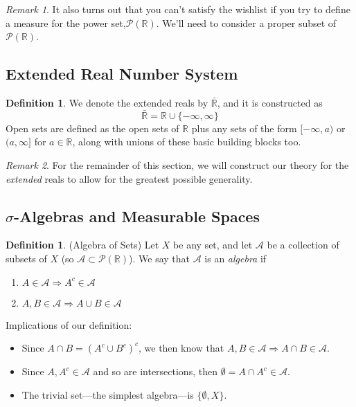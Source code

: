 \documentclass[12pt]{article}
\theoremstyle{plain}
\theoremstyle{definition}
\newtheorem{defn}[thm]{Definition}
\theoremstyle{remark}
\newtheorem*{rmk}{Remark}
\begin{document}
\begin{rmk}
    It also turns out that you can't satisfy the wishlist if you try to define a measure for the power set,$\mathscr{P}(\mathbb{R})$. We'll need to consider a proper subset of $\mathscr{P}(\mathbb{R})$.
\end{rmk}

\subsection{Extended Real Number System}

\begin{defn}
We denote the extended reals by $\bar{\mathbb{R}}$, and it is constructed as 
\[ 
    \bar{\mathbb{R}} = {\mathbb{R}} \cup \{-\infty, \infty\}
\]
Open sets are defined as the open sets of $\mathbb{R}$ plus any sets of the form $[-\infty, a)$ or $(a,\infty]$ for $a\in\mathbb{R}$, along with unions of these basic building blocks too.
\end{defn}

\begin{rmk}
For the remainder of this section, we will construct our theory for the \emph{extended} reals to allow for the greatest possible generality.
\end{rmk}

\subsection{$\sigma$-Algebras and Measurable Spaces}

\begin{defn} 
\label{algebra}
(Algebra of Sets)
Let $X$ be any set, and let $\mathscr{A}$ be a collection of subsets of $X$ (so $\mathscr{A}\subset\mathscr{P}(\mathbb{R})$). We say that $\mathscr{A}$ is an \emph{algebra} if 
\begin{enumerate}
    \item $A\in\mathscr{A}\Rightarrow A^c\in\mathscr{A}$
    \item $A,B\in\mathscr{A} \Rightarrow A\cup B\in\mathscr{A}$
\end{enumerate}
Implications of our definition:
\begin{itemize}
    \item Since $A\cap B = (A^c \cup B^c)^c$, we then know that $A,B\in\mathscr{A}\Rightarrow A\cap B\in \mathscr{A}$.
    \item Since $A, A^c \in \mathscr{A}$ and so are intersections, then $\emptyset = A\cap A^c \in \mathscr{A}$.
    \item The trivial set---the simplest algebra---is $\{\emptyset, X\}$.
\end{itemize}
\end{defn}
\end{document}
